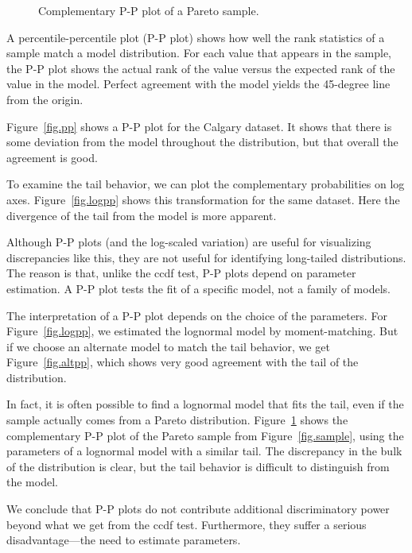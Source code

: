 \documentclass[twocolumn,11pt]{infocom}
\begin{document}
\begin{figure}[tb]
\centerline{}
\caption{Complementary P-P plot of a Pareto sample.}
\label{fig.paretopp}
\end{figure}

A percentile-percentile plot (P-P plot) shows how well the rank
statistics of a sample match a model distribution.  For each value
that appears in the sample, the P-P plot shows the actual rank of
the value versus the expected rank of the value in the model.
Perfect agreement with the model yields the 45-degree line from
the origin.

Figure~\ref{fig.pp} shows a P-P plot for the Calgary dataset.
It shows that there is some deviation from the model throughout
the distribution, but that overall the agreement is good.

To examine the tail behavior, we can plot the complementary probabilities
on log axes.  Figure~\ref{fig.logpp} shows this transformation for
the same dataset.  Here the divergence of the tail from the model
is more apparent.

Although P-P plots (and the log-scaled variation) are useful for
visualizing discrepancies like this, they are not useful for
identifying long-tailed distributions.  The reason is that, unlike the
ccdf test, P-P plots depend on parameter estimation.  A P-P plot tests
the fit of a specific model, not a family of models.

The interpretation of a P-P plot depends on the choice of the
parameters.  For Figure~\ref{fig.logpp}, we estimated the lognormal
model by moment-matching.  But if we choose an alternate model to
match the tail behavior, we get Figure~\ref{fig.altpp}, which shows
very good agreement with the tail of the distribution.

In fact, it is often possible to find a lognormal model that fits
the tail, even if the sample actually comes from a Pareto
distribution.  Figure~\ref{fig.paretopp} shows the complementary P-P
plot of the Pareto sample from Figure~\ref{fig.sample}, using
the parameters of a lognormal model with a similar tail.  The
discrepancy in the bulk of the distribution is clear, but the tail
behavior is difficult to distinguish from the model.

We conclude that P-P plots do not contribute additional discriminatory
power beyond what we get from the ccdf test.  Furthermore, they
suffer a serious disadvantage---the need to estimate parameters.
\end{document}
